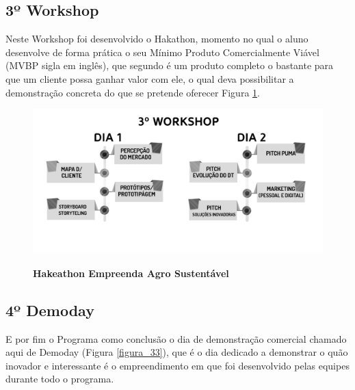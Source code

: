 \subsection{3º Workshop}
 
Neste Workshop foi desenvolvido o Hakathon, momento no qual o aluno desenvolve de forma prática o seu Mínimo Produto Comercialmente Viável (MVBP sigla em inglês), que segundo  é um produto completo o bastante para que um cliente possa ganhar valor com ele, o qual deva possibilitar a demonstração concreta do que se pretende oferecer Figura \ref{figura_32}. 


\begin{figure}[h!]
\centering
\caption{\textbf{Hakeathon Empreenda Agro Sustentável}}
\includegraphics[scale=0.4]{Imagens/workshop-03.png}
\label{figura_32}
\end{figure}


\subsection{4º Demoday}

E por fim o Programa como conclusão o dia de demonstração comercial chamado aqui de Demoday (Figura \ref{figura_33}), que é o dia dedicado a demonstrar o quão inovador e interessante é o empreendimento em que foi desenvolvido pelas equipes durante todo o programa.


